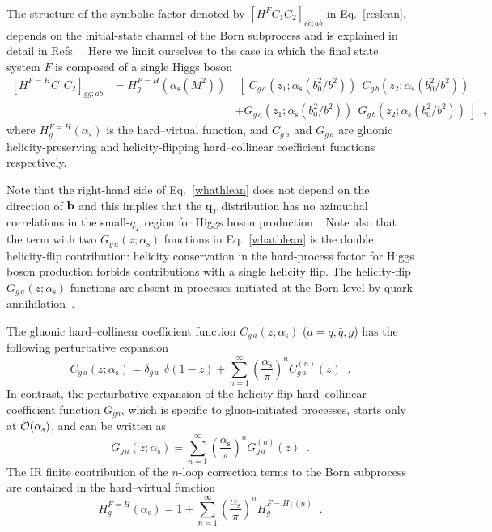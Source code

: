 \documentclass[12pt]{article}
\def\beeq{\begin{eqnarray}}
\def\eeeq{\end{eqnarray}}
\def\nn{\nonumber}
\DeclareRobustCommand{\as}{\ensuremath{\alpha_{\mathrm{s}}}}
\DeclareRobustCommand{\qt}{q_T}
\DeclareRobustCommand{\bqt}{\ensuremath{\mathbf{q}_T}}
\begin{document}
The structure of the symbolic factor denoted by $\left[ H^{F} C_1 C_2 \right]_{c\bar{c};a b}$ in Eq.~\eqref{reslean}, depends on the initial-state channel of the Born subprocess and is explained in detail in Refs.~\cite{Catani:2010pd,Catani:2013tia}. Here we limit ourselves to the case in which the final state system $F$ is composed of a single Higgs boson
\beeq
\label{whathlean}
\left[ H^{F=H} C_1 C_2 \right]_{gg;ab}
&= H_{g}^{F=H}(\as(M^2)) &\;\left[ \; C_{g \,a}(z_1;\as(b_0^2/b^2)) 
\;\, C_{g \,b}(z_2;\as(b_0^2/b^2)) \right.
\nn \\
&&+ \left.  G_{g \,a}(z_1;\as(b_0^2/b^2)) 
\;\, G_{g \,b}(z_2;\as(b_0^2/b^2)) \;
\right]
\;\;,
\eeeq
where 
$H_{g}^{F=H}(\as)$ is the hard--virtual function, and $C_{g \,a}$ and $G_{g \,a}$ are 
gluonic helicity-preserving and helicity-flipping hard--collinear coefficient functions respectively.

Note that the right-hand side of Eq.~\eqref{whathlean} does not depend on the direction of $\bf b$ and this implies that the $\bqt$ distribution has no azimuthal correlations in the small-$\qt$ region for Higgs boson production~\cite{Catani:2010pd}. 
Note also that the term with two $G_{g \,a}(z;\as)$ functions in Eq.~\eqref{whathlean} is the double helicity-flip contribution: helicity conservation in the hard-process factor for Higgs boson production forbids contributions with a single helicity flip. 
The helicity-flip $G_{g \,a}(z;\as)$ functions are absent in processes initiated at the Born level by quark annihilation~\cite{Catani:2010pd}. 

The gluonic hard--collinear coefficient function $C_{g \,a}(z;\as)$ ($a=q,{\bar q},g$) has the following perturbative expansion
\begin{equation}
\label{cgexp} 
C_{g \,a}(z;\as) = \delta_{g \,a} \;\,\delta(1-z) + 
\sum_{n=1}^\infty \left( \frac{\as}{\pi} \right)^n C_{g\, a}^{(n)}(z) \;\;.
\end{equation}
In contrast, the perturbative expansion of the helicity flip hard--collinear coefficient function $G_{ga}$, which is specific to gluon-initiated processes, starts only at ${\cal O}(\as)$, and can be written as~\cite{Catani:2010pd,Catani:2013tia}
\begin{equation}
\label{gfexp}
G_{g \,a}(z;\as) =
\sum_{n=1}^\infty \left( \frac{\as}{\pi} \right)^n G_{g \,a}^{(n)}(z) \;\;.
\end{equation}
The IR finite contribution of the $n$-loop correction terms to the Born subprocess are contained in the hard--virtual function
\begin{equation}
\label{hexp}
H_g^{F=H}(\as) = 1+ \sum_{n=1}^\infty 
\left( \frac{\as}{\pi} \right)^n 
H_g^{F=H \,;(n)}
\;\;.
\end{equation} 
\end{document}
